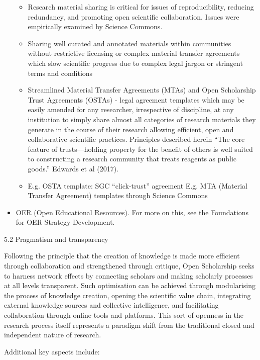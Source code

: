 \documentclass[]{article}
\begin{document}
\begin{itemize}
  \begin{itemize}
  \item
    Research material sharing is critical for issues of reproducibility,
    reducing redundancy, and promoting open scientific collaboration.
    Issues were empirically examined by Science Commons.
  \item
    Sharing well curated and annotated materials within communities
    without restrictive licensing or complex material transfer
    agreements which slow scientific progress due to complex legal
    jargon or stringent terms and conditions
  \item
    Streamlined Material Transfer Agreements (MTAs) and Open Scholarship
    Trust Agreements (OSTAs) - legal agreement templates which may be
    easily amended for any researcher, irrespective of discipline, at
    any institution to simply share almost all categories of research
    materials they generate in the course of their research allowing
    efficient, open and collaborative scientific practices. Principles
    described herein ``The core feature of trusts---holding property for
    the benefit of others is well suited to constructing a research
    community that treats reagents as public goods.'' Edwards et al
    (2017).
  \item
    E.g. OSTA template: SGC ``click-trust'' agreement E.g. MTA (Material
    Transfer Agreement) templates through Science Commons
  \end{itemize}
\item
  OER (Open Educational Resources). For more on this, see the
  Foundations for OER Strategy Development.
\end{itemize}

5.2 Pragmatism and transparency

Following the principle that the creation of knowledge is made more
efficient through collaboration and strengthened through critique, Open
Scholarship seeks to harness network effects by connecting scholars and
making scholarly processes at all levels transparent. Such optimisation
can be achieved through modularising the process of knowledge creation,
opening the scientific value chain, integrating external knowledge
sources and collective intelligence, and facilitating collaboration
through online tools and platforms. This sort of openness in the
research process itself represents a paradigm shift from the traditional
closed and independent nature of research.

Additional key aspects include:
\end{document}
